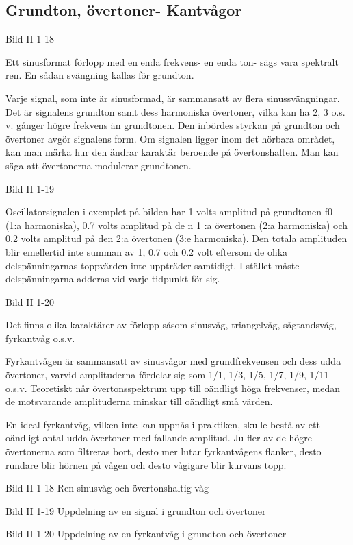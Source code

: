 \subsection{Grundton, övertoner- Kantvågor}

Bild II 1-18

Ett sinusformat förlopp med en enda frekvens- en enda ton- sägs vara spektralt ren.
En sådan svängning kallas för grundton.

Varje signal, som inte är sinusformad, är sammansatt av flera sinussvängningar. Det är
signalens grundton samt dess harmoniska övertoner, vilka kan ha 2, 3 o.s. v. gånger högre
frekvens än grundtonen. Den inbördes styrkan på grundton och övertoner avgör signalens
form. Om signalen ligger inom det hörbara området, kan man märka hur den ändrar karaktär
beroende på övertonshalten. Man kan säga att övertonerna modulerar grundtonen.

Bild II 1-19

Oscillatorsignalen i exemplet på bilden har 1 volts amplitud på grundtonen f0 (1:a
harmoniska), 0.7 volts amplitud på de n 1 :a övertonen (2:a harmoniska) och 0.2 volts
amplitud på den 2:a övertonen (3:e harmoniska). Den totala amplituden blir emellertid inte
summan av 1, 0.7 och 0.2 volt eftersom de olika delspänningarnas toppvärden inte uppträder
samtidigt. I stället måste delspänningarna adderas vid varje tidpunkt för sig.

Bild II 1-20

Det finns olika karaktärer av förlopp såsom sinusvåg, triangelvåg, sågtandsvåg,
fyrkantvåg o.s.v.

Fyrkantvågen är sammansatt av sinusvågor med grundfrekvensen och dess udda övertoner,
varvid amplituderna fördelar sig som 1/1, 1/3, 1/5, 1/7, 1/9, 1/11 o.s.v. Teoretiskt når
övertonsspektrum upp till oändligt höga frekvenser, medan de motsvarande amplituderna
minskar till oändligt små värden.

En ideal fyrkantvåg, vilken inte kan uppnås i praktiken, skulle bestå av ett oändligt
antal udda övertoner med fallande amplitud. Ju fler av de högre övertonerna som filtreras
bort, desto mer lutar fyrkantvågens flanker, desto rundare blir hörnen på vågen och
desto vågigare blir kurvans topp.

Bild II 1-18 Ren sinusvåg och övertonshaltig våg

Bild II 1-19 Uppdelning av en signal i grundton och övertoner

Bild II 1-20 Uppdelning av en fyrkantvåg i grundton och övertoner

